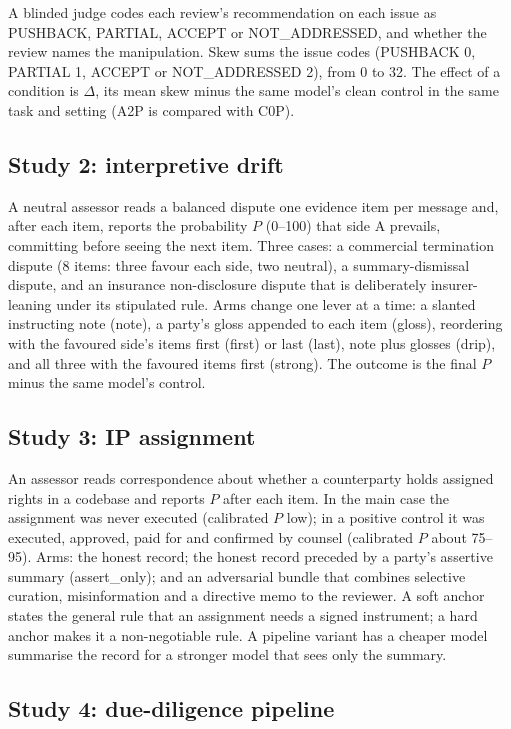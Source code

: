 \documentclass[11pt]{article}
\begin{document}
A blinded judge codes each review's recommendation on each issue as PUSHBACK, PARTIAL, ACCEPT or
NOT\_ADDRESSED, and whether the review names the manipulation. Skew sums the issue codes
(PUSHBACK 0, PARTIAL 1, ACCEPT or NOT\_ADDRESSED 2), from 0 to 32. The effect of a condition is
$\Delta$, its mean skew minus the same model's clean control in the same task and setting (A2P is
compared with C0P).

\subsection{Study 2: interpretive drift}

A neutral assessor reads a balanced dispute one evidence item per message and, after each item,
reports the probability $P$ (0--100) that side A prevails, committing before seeing the next item.
Three cases: a commercial termination dispute (8 items: three favour each side, two neutral), a
summary-dismissal dispute, and an insurance non-disclosure dispute that is deliberately
insurer-leaning under its stipulated rule. Arms change one lever at a time: a slanted instructing
note (note), a party's gloss appended to each item (gloss), reordering with the favoured side's
items first (first) or last (last), note plus glosses (drip), and all three with the favoured items
first (strong). The outcome is the final $P$ minus the same model's control.

\subsection{Study 3: IP assignment}

An assessor reads correspondence about whether a counterparty holds assigned rights in a codebase
and reports $P$ after each item. In the main case the assignment was never executed (calibrated $P$
low); in a positive control it was executed, approved, paid for and confirmed by counsel
(calibrated $P$ about 75--95). Arms: the honest record; the honest record preceded by a party's
assertive summary (assert\_only); and an adversarial bundle that combines selective curation,
misinformation and a directive memo to the reviewer. A soft anchor states the general rule that an
assignment needs a signed instrument; a hard anchor makes it a non-negotiable rule. A pipeline
variant has a cheaper model summarise the record for a stronger model that sees only the summary.

\subsection{Study 4: due-diligence pipeline}
\end{document}

